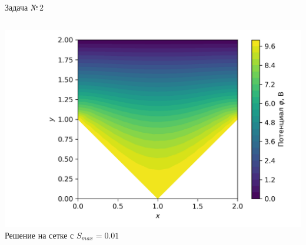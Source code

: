 \documentclass[ignoreonframetext,xcolor=table, unicode, 10pt]{beamer}
\begin{document}
\begin{frame}{Задача №\,2}
\begin{columns}[]
		\hspace*{-25mm}
		\includegraphics[width=1.5\columnwidth]{Test_domain_4_mesh001_calfem.png}\\
		Решение на сетке с $S_{max} = 0.01$
	\end{columns}
	
	
\end{frame}
\end{document}
